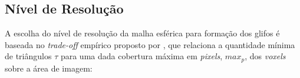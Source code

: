 
\subsection{Nível de Resolução}
\label{malha_esferica}

A escolha do nível de resolução da malha esférica para formação dos glifos é baseada no \textit{trade-off} empírico proposto por , que relaciona a quantidade mínima de triângulos $\tau$ para uma dada cobertura máxima em \textit{pixels}, $max_p$, dos \textit{voxels} sobre a área de imagem:

